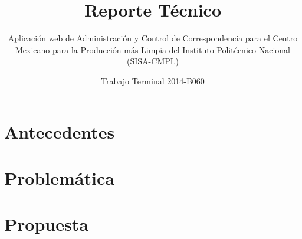 \documentclass[oneside,10pt]{book}
\title{Reporte Técnico}
\subtitle{Aplicación web de Administración y Control de Correspondencia para el Centro Mexicano para la Producción más Limpia del Instituto Politécnico Nacional (SISA-CMPL)}
\author{Trabajo Terminal 2014-B060}
\begin{document}
\maketitle
\thispagestyle{empty}

\frontmatter
\tableofcontents

\mainmatter



\chapter{Antecedentes}
	

\chapter{Problemática}


\chapter{Propuesta}







\end{document}
